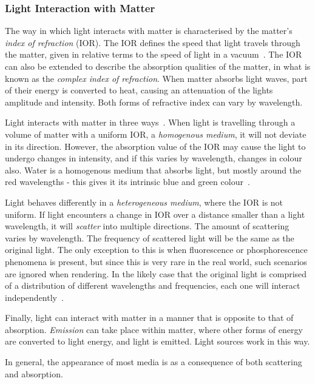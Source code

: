 \subsubsection{Light Interaction with Matter}

The way in which light interacts with matter is characterised by the matter's \textit{index of refraction} (IOR). The IOR defines the speed that light travels through the matter, given in relative terms to the speed of light in a vacuum~\cite{HowLightInteractsWithMatter}. The IOR can also be extended to describe the absorption qualities of the matter, in what is known as the \textit{complex index of refraction}. When matter absorbs light waves, part of their energy is converted to heat, causing an attenuation of the lights amplitude and intensity. Both forms of refractive index can vary by wavelength.

Light interacts with matter in three ways~\cite{HoffmanPBSBackground}. When light is travelling through a volume of matter with a uniform IOR, a \textit{homogenous medium}, it will not deviate in its direction. However, the absorption value of the IOR may cause the light to undergo changes in intensity, and if this varies by wavelength, changes in colour also. Water is a homogenous medium that absorbs light, but mostly around the red wavelengths - this gives it its intrinsic blue and green colour~\cite{HowLightInteractsWithMatter}.

Light behaves differently in a \textit{heterogeneous medium}, where the IOR is not uniform. If light encounters a change in IOR over a distance smaller than a light wavelength, it will \textit{scatter} into multiple directions. The amount of scattering varies by wavelength. The frequency of scattered light will be the same as the original light. The only exception to this is when fluorescence or phosphorescence phenomena is present, but since this is very rare in the real world, such scenarios are ignored when rendering. In the likely case that the original light is comprised of a distribution of different wavelengths and frequencies, each one will interact independently~\cite{RTR4}.

Finally, light can interact with matter in a manner that is opposite to that of absorption. \textit{Emission} can take place within matter, where other forms of energy are converted to light energy, and light is emitted. Light sources work in this way.

In general, the appearance of most media is as a consequence of both scattering and absorption.

